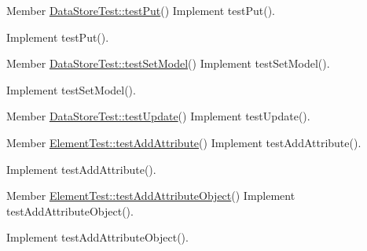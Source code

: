 \label{todo__todo000005}
\hypertarget{todo__todo000005}{}
 
\begin{DoxyDescription}
\item[Member \hyperlink{class_data_store_test_a029b5c4d2f0cf0433023c14a2aaa44c7}{DataStoreTest::testPut}() ]Implement testPut().

Implement testPut().
\end{DoxyDescription}

\label{todo__todo000003}
\hypertarget{todo__todo000003}{}
 
\begin{DoxyDescription}
\item[Member \hyperlink{class_data_store_test_af24b63b987b9ef29ba6abc7e09342b0e}{DataStoreTest::testSetModel}() ]Implement testSetModel().

Implement testSetModel().
\end{DoxyDescription}

\label{todo__todo000006}
\hypertarget{todo__todo000006}{}
 
\begin{DoxyDescription}
\item[Member \hyperlink{class_data_store_test_a0dafcbb4eee758f21288eb51775666dc}{DataStoreTest::testUpdate}() ]Implement testUpdate().
\end{DoxyDescription}

\label{todo__todo000122}
\hypertarget{todo__todo000122}{}
 
\begin{DoxyDescription}
\item[Member \hyperlink{class_element_test_ab4dde936a604e1a8a6883db5c6c995d7}{ElementTest::testAddAttribute}() ]Implement testAddAttribute().

Implement testAddAttribute().
\end{DoxyDescription}

\label{todo__todo000121}
\hypertarget{todo__todo000121}{}
 
\begin{DoxyDescription}
\item[Member \hyperlink{class_element_test_ab2c2e68c0f60c713d68e826339ba7901}{ElementTest::testAddAttributeObject}() ]Implement testAddAttributeObject().

Implement testAddAttributeObject().
\end{DoxyDescription}

\label{todo__todo000120}
\hypertarget{todo__todo000120}{}
 

